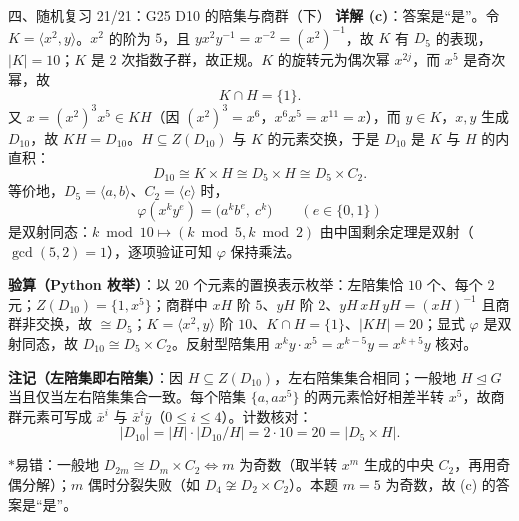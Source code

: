 \documentclass[aspectratio=169,10pt,fontset=none]{ctexbeamer}
\newcommand{\key}[1]{\textcolor{ink}{\bfseries #1}}
\newcommand{\starpt}{\textcolor{accent}{\bfseries$\ast$}}
\begin{document}
\begin{frame}[t]{四、随机复习 21/21：G25 D10 的陪集与商群（下）}
\scriptsize
\key{详解 (c)}：答案是“是”。令 $K=\langle x^2,y\rangle$。$x^2$ 的阶为 $5$，且 $yx^2y^{-1}=x^{-2}=(x^2)^{-1}$，故 $K$ 有 $D_5$ 的表现，$|K|=10$；$K$ 是 $2$ 次指数子群，故正规。$K$ 的旋转元为偶次幂 $x^{2j}$，而 $x^5$ 是奇次幂，故
\[ K\cap H=\{1\}. \]
又 $x=(x^2)^3x^5\in KH$（因 $(x^2)^3=x^6$，$x^6x^5=x^{11}=x$），而 $y\in K$，$x,y$ 生成 $D_{10}$，故 $KH=D_{10}$。$H\subseteq Z(D_{10})$ 与 $K$ 的元素交换，于是 $D_{10}$ 是 $K$ 与 $H$ 的内直积：
\[ D_{10}\cong K\times H\cong D_5\times H\cong D_5\times C_2. \]
等价地，$D_5=\langle a,b\rangle$、$C_2=\langle c\rangle$ 时，
\[ \varphi(x^ky^e)=\bigl(a^k b^e,\ c^{k}\bigr)\qquad(e\in\{0,1\}) \]
是双射同态：$k\bmod10\mapsto(k\bmod5,k\bmod2)$ 由中国剩余定理是双射（$\gcd(5,2)=1$），逐项验证可知 $\varphi$ 保持乘法。

\key{验算（Python 枚举）}：以 $20$ 个元素的置换表示枚举：左陪集恰 $10$ 个、每个 $2$ 元；$Z(D_{10})=\{1,x^5\}$；商群中 $xH$ 阶 $5$、$yH$ 阶 $2$、$yH\,xH\,yH=(xH)^{-1}$ 且商群非交换，故 $\cong D_5$；$K=\langle x^2,y\rangle$ 阶 $10$、$K\cap H=\{1\}$、$|KH|=20$；显式 $\varphi$ 是双射同态，故 $D_{10}\cong D_5\times C_2$。反射型陪集用 $x^ky\cdot x^5=x^{k-5}y=x^{k+5}y$ 核对。

\key{注记（左陪集即右陪集）}：因 $H\subseteq Z(D_{10})$，左右陪集集合相同；一般地 $H\trianglelefteq G$ 当且仅当左右陪集集合一致。每个陪集 $\{a,ax^5\}$ 的两元素恰好相差半转 $x^5$，故商群元素可写成 $\bar x^i$ 与 $\bar x^i\bar y$（$0\le i\le4$）。计数核对：
\[ |D_{10}|=|H|\cdot|D_{10}/H|=2\cdot10=20=|D_5\times H|. \]

\starpt 易错：一般地 $D_{2m}\cong D_m\times C_2\iff m$ 为奇数（取半转 $x^m$ 生成的中央 $C_2$，再用奇偶分解）；$m$ 偶时分裂失败（如 $D_4\not\cong D_2\times C_2$）。本题 $m=5$ 为奇数，故 (c) 的答案是“是”。
\end{frame}

\end{document}
